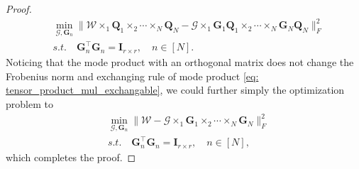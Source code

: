 \begin{proof}
\begin{equation}
\begin{aligned}
&\min_{\mathscr{G}, \mathbf{G}_n} \|\mathscr{W}\times_1 \mathbf{Q}_1 \times_2\cdots \times_N \mathbf{Q}_N-\mathscr{G}\times_1 \mathbf{G}_1\mathbf{Q}_1 \times_2\cdots \times_N \mathbf{G}_N\mathbf{Q}_N\|_F^2\\
& s.t. \quad \mathbf{G}_n^\top \mathbf{G}_n = \mathbf{I}_{r\times r}, \quad n \in [N].
\end{aligned}
\end{equation}
Noticing that the mode product with an orthogonal matrix does not change the Frobenius norm and exchanging rule of mode product \eqref{eq: tensor_product_mul_exchangable}, we could further simply the optimization problem to 
\begin{equation}
\begin{aligned}
&\min_{\mathscr{G}, \mathbf{G}_n} \|\mathscr{W}-\mathscr{G}\times_1 \mathbf{G}_1 \times_2\cdots \times_N \mathbf{G}_N\|_F^2\\
& s.t. \quad \mathbf{G}_n^\top \mathbf{G}_n = \mathbf{I}_{r\times r}, \quad n \in [N],
\end{aligned}
\end{equation}
which completes the proof. 
\end{proof}